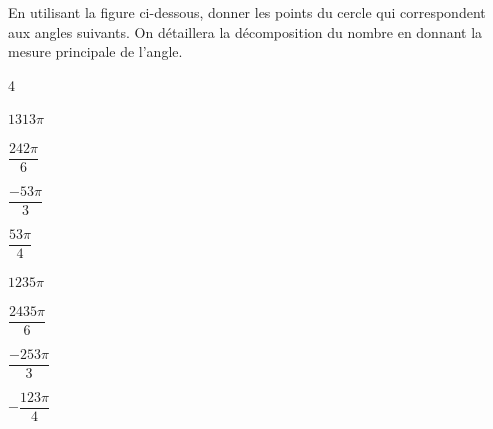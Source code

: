 \documentclass[11pt,a4paper]{article}  %
\begin{document}
	\graphicspath{{images/}}
	
	\begin{center}
		
		
	\end{center}



En utilisant la figure ci-dessous, donner les points du cercle qui correspondent aux angles suivants. On détaillera la décomposition du nombre en donnant la mesure principale de l'angle.
\begin{multicols}{4}
	\begin{enumMet}
		\item $1313\pi$
		\item $\dfrac{242\pi}{6}$
		\item $\dfrac{-53\pi}{3}$
		\item $\dfrac{53\pi}{4}$
		\item $1235\pi$
		\item $\dfrac{2435\pi}{6}$
		\item $\dfrac{-253\pi}{3}$
		\item $-\dfrac{123\pi}{4}$
	\end{enumMet}
\end{multicols}
\ \\
\end{document}
